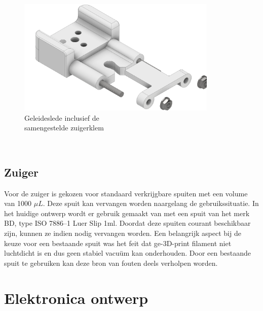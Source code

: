\begin{minipage}[t]{0.59\textwidth}
    \vspace{0pt}
    \begin{figure}[H]
        \centering
        \includegraphics[width=0.85\textwidth]{figures/CarriageAndClamp.png}
        \caption{Geleideslede inclusief de \\samengestelde zuigerklem}\label{fig:CarriageAndClamp}
    \end{figure}
\end{minipage}\\

\subsection{Zuiger}
Voor de zuiger is gekozen voor standaard verkrijgbare spuiten met een volume van 1000 $\mu L$. Deze spuit kan vervangen worden naargelang de gebruikssituatie. In het huidige ontwerp wordt er gebruik gemaakt van met een spuit van het merk BD, type ISO 7886--1 Luer Slip 1ml. Doordat deze spuiten courant beschikbaar zijn, kunnen ze indien nodig vervangen worden.
Een belangrijk aspect bij de keuze voor een bestaande spuit was het feit dat ge-3D-print filament niet luchtdicht is en dus geen stabiel vacuüm kan onderhouden. Door een bestaande spuit te gebruiken kan deze bron van fouten deels verholpen worden.

\section{Elektronica ontwerp}
